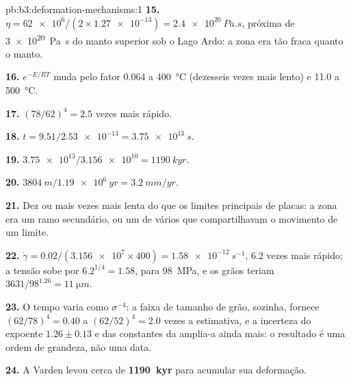 \begin{solution}{pb:b3:deformation-mechanisms:1}
\textbf{15.} $\eta = \num{62e6}/(2\times\num{1.27e-13}) = \qty{2.4e20}{Pa.s}$,
próxima de \qty{3e20}{Pa.s} do manto superior sob o Lago Ardo: a zona
era tão fraca quanto o manto.

\textbf{16.} $e^{-E/RT}$ muda pelo fator 0.064 a \qty{400}{\celsius}
(dezesseis vezes mais lento) e 11.0 a \qty{500}{\celsius}.

\textbf{17.} $(78/62)^4 = 2.5$ vezes mais rápido.

\textbf{18.} $t = 9.51/\num{2.53e-13} = \qty{3.75e13}{s}$.

\textbf{19.} $\num{3.75e13}/\num{3.156e10} = \qty{1190}{kyr}$.

\textbf{20.} $\qty{3804}{m}/\qty{1.19e6}{yr} = \qty{3.2}{mm/yr}$.

\textbf{21.} Dez ou mais vezes mais lenta do que os limites principais de placas: a zona
era um ramo secundário, ou um de vários que compartilhavam o movimento de um limite.

\textbf{22.} $\dot\gamma = 0.02/(\num{3.156e7}\times400) = \qty{1.58e-12}{s^{-1}}$,
6.2 vezes mais rápido; a tensão sobe por $6.2^{1/4} = 1.58$, para \qty{98}{MPa}, e
os grãos teriam $3631/98^{1.26} = \qty{11}{\micro m}$.

\textbf{23.} O tempo varia como $\sigma^{-4}$: a faixa de tamanho de grão, sozinha, fornece
$(62/78)^4 = 0.40$ a $(62/52)^4 = 2.0$ vezes a estimativa, e a
incerteza do expoente $1.26 \pm 0.13$ e das constantes da 
amplia-a ainda mais: o resultado é uma ordem de grandeza, não uma data.

\textbf{24.} A  Varden levou cerca de
\textbf{\qty[text-series-to-math=true]{1190}{kyr}} para acumular sua deformação.
\end{solution}
